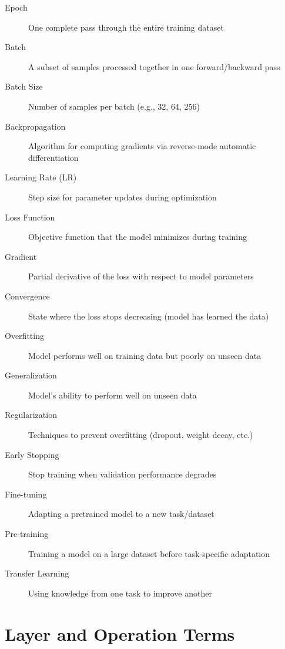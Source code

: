 \begin{description}
    \item[Epoch] One complete pass through the entire training dataset
    \item[Batch] A subset of samples processed together in one forward/backward pass
    \item[Batch Size] Number of samples per batch (e.g., 32, 64, 256)
    \item[Backpropagation] Algorithm for computing gradients via reverse-mode automatic differentiation
    \item[Learning Rate (LR)] Step size for parameter updates during optimization
    \item[Loss Function] Objective function that the model minimizes during training
    \item[Gradient] Partial derivative of the loss with respect to model parameters
    \item[Convergence] State where the loss stops decreasing (model has learned the data)
    \item[Overfitting] Model performs well on training data but poorly on unseen data
    \item[Generalization] Model's ability to perform well on unseen data
    \item[Regularization] Techniques to prevent overfitting (dropout, weight decay, etc.)
    \item[Early Stopping] Stop training when validation performance degrades
    \item[Fine-tuning] Adapting a pretrained model to a new task/dataset
    \item[Pre-training] Training a model on a large dataset before task-specific adaptation
    \item[Transfer Learning] Using knowledge from one task to improve another
\end{description}

\section{Layer and Operation Terms}

